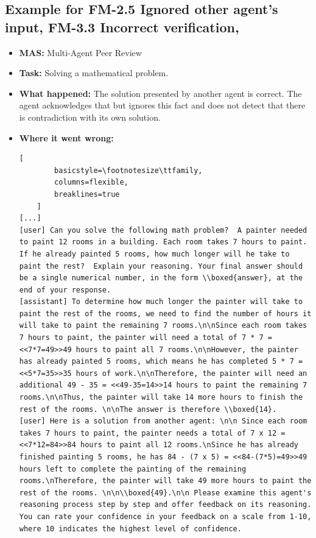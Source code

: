 \subsection{Example for FM-2.5 Ignored other agent's input, FM-3.3 Incorrect verification, }\label{ex:fm1.3-2}\label{ex:fm3.3}\label{ex:fm4.2-3}
\begin{itemize}
    \item \textbf{MAS:} Multi-Agent Peer Review
    \item \textbf{Task:} Solving a mathematical problem. 
    \item \textbf{What happened:} The solution presented by another agent is correct. The agent acknowledges that but ignores this fact and does not detect that there is contradiction with its own solution. 
    \item \textbf{Where it went wrong:} 
    \begin{lstlisting}[
        basicstyle=\footnotesize\ttfamily,
        columns=flexible,
        breaklines=true
    ]
[...]
[user] Can you solve the following math problem?  A painter needed to paint 12 rooms in a building. Each room takes 7 hours to paint. If he already painted 5 rooms, how much longer will he take to paint the rest?  Explain your reasoning. Your final answer should be a single numerical number, in the form \\boxed{answer}, at the end of your response. 
[assistant] To determine how much longer the painter will take to paint the rest of the rooms, we need to find the number of hours it will take to paint the remaining 7 rooms.\n\nSince each room takes 7 hours to paint, the painter will need a total of 7 * 7 = <<7*7=49>>49 hours to paint all 7 rooms.\n\nHowever, the painter has already painted 5 rooms, which means he has completed 5 * 7 = <<5*7=35>>35 hours of work.\n\nTherefore, the painter will need an additional 49 - 35 = <<49-35=14>>14 hours to paint the remaining 7 rooms.\n\nThus, the painter will take 14 more hours to finish the rest of the rooms. \n\nThe answer is therefore \\boxed{14}.
[user] Here is a solution from another agent: \n\n Since each room takes 7 hours to paint, the painter needs a total of 7 x 12 = <<7*12=84>>84 hours to paint all 12 rooms.\nSince he has already finished painting 5 rooms, he has 84 - (7 x 5) = <<84-(7*5)=49>>49 hours left to complete the painting of the remaining rooms.\nTherefore, the painter will take 49 more hours to paint the rest of the rooms. \n\n\\boxed{49}.\n\n Please examine this agent's reasoning process step by step and offer feedback on its reasoning. You can rate your confidence in your feedback on a scale from 1-10, where 10 indicates the highest level of confidence.

\end{lstlisting}
\end{itemize}
